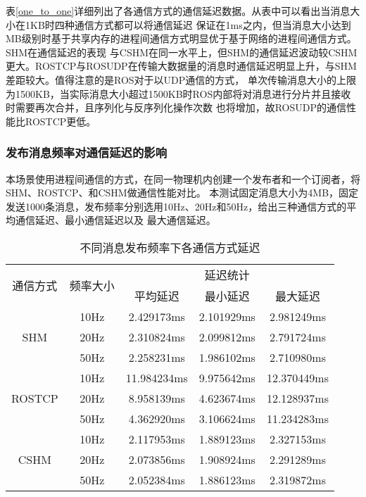 表\ref{one_to_one}详细列出了各通信方式的通信延迟数据。从表中可以看出当消息大小在1KB时四种通信方式都可以将通信延迟
保证在1ms之内，但当消息大小达到MB级别时基于共享内存的进程间通信方式明显优于基于网络的进程间通信方式。SHM在通信延迟的表现
与CSHM在同一水平上，但SHM的通信延迟波动较CSHM更大。ROSTCP与ROSUDP在传输大数据量的消息时通信延迟明显上升，与SHM差距较大。值得注意的是ROS对于以UDP通信的方式，
单次传输消息大小的上限为1500KB，当实际消息大小超过1500KB时ROS内部将对消息进行分片并且接收时需要再次合并，且序列化与反序列化操作次数
也将增加，故ROSUDP的通信性能比ROSTCP更低。

\subsubsection{发布消息频率对通信延迟的影响}
本场景使用进程间通信的方式，在同一物理机内创建一个发布者和一个订阅者，将SHM、ROSTCP、和CSHM做通信性能对比。
本测试固定消息大小为4MB，固定发送1000条消息，发布频率分别选用10Hz、20Hz和50Hz，给出三种通信方式的平均通信延迟、最小通信延迟以及
最大通信延迟。

\begin{table}[htb]
  \centering\small
  \caption{不同消息发布频率下各通信方式延迟}
  \renewcommand\arraystretch{1.2}
  \label{frequency_test}
  \begin{tabular}{ccccc}
    \toprule
    \multirow{2}{*}{通信方式} & \multirow{2}{*}{频率大小} & \multicolumn{3}{c}{延迟统计}\\
     & & 平均延迟 & 最小延迟 & 最大延迟\\
    \midrule
    \multirow{3}{*}{SHM} & 10Hz& 2.429173ms& 2.101929ms& 2.981249ms\\ & 20Hz & 2.310824ms & 2.099812ms & 2.791724ms \\ & 50Hz & 2.258231ms & 1.986102ms & 2.710980ms \\
    \hline
    \multirow{3}{*}{ROSTCP} & 10Hz& 11.984234ms& 9.975642ms& 12.370449ms\\ & 20Hz & 8.958139ms & 4.623674ms & 12.128937ms \\ & 50Hz & 4.362920ms & 3.106624ms & 11.234283ms \\
    \hline
    \multirow{3}{*}{CSHM} & 10Hz& 2.117953ms& 1.889123ms& 2.327153ms\\ & 20Hz & 2.073856ms & 1.908924ms & 2.291289ms \\ & 50Hz & 2.052384ms & 1.886123ms & 2.319872ms \\
    \bottomrule
  \end{tabular}
\end{table}

